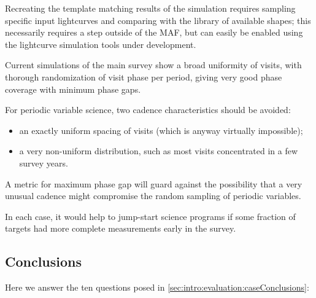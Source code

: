 Recreating the template matching results of the
\citet{2012AJ....144....9O} simulation requires sampling specific input
lightcurves and comparing with the library of available shapes; this
necessarily requires a step outside of the MAF, but can easily be
enabled using the lightcurve simulation tools under development.

Current simulations of the main survey show a broad uniformity of
visits, with thorough randomization of visit phase per period, giving
very good phase coverage with minimum phase gaps.


%

For periodic variable science, two cadence characteristics should be avoided:
\begin{itemize}
\item an exactly uniform spacing of visits (which is anyway virtually impossible); \
\item a very non-uniform distribution, such as most visits concentrated in a few survey years.
 \end{itemize}

A metric for maximum phase gap will guard against the possibility that a
very unusual cadence might compromise the random sampling of periodic
variables.

In each case, it would help to jump-start science programs if some
fraction of targets had more complete measurements early in the survey.


 \subsection{Conclusions}

 Here we answer the ten questions posed in
 \autoref{sec:intro:evaluation:caseConclusions}:

